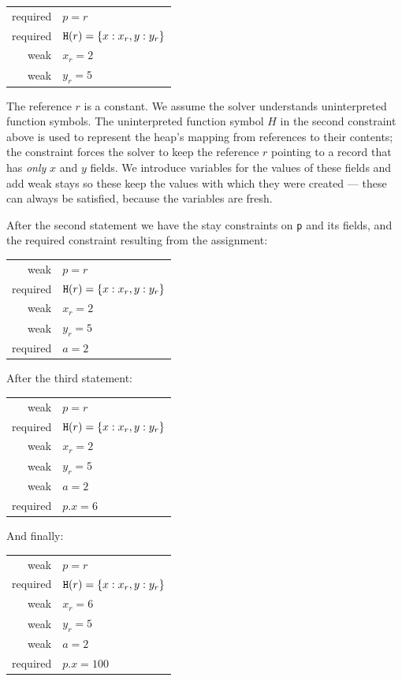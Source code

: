 \documentclass{article}
\newcommand{\Deref}{\texttt{\upshape H}}
\begin{document}
\begin{tabular}{rl}
required & $p = r$ \\
required & $\Deref(r) = \{x:x_r, y:y_r\}$\\
weak & $x_r = 2$\\
weak & $y_r = 5$\\
\end{tabular}

The reference $r$ is a constant. We assume the solver understands
uninterpreted function symbols.  The uninterpreted function symbol $H$
in the second constraint above is used to represent the heap's mapping
from references to their contents; the constraint forces the solver to
keep the reference $r$ pointing to a record that has \emph{only} $x$
and $y$ fields. We introduce variables for the values of these fields
and add weak stays so these keep the values with which they were
created --- these can always be satisfied, because the variables are
fresh.

After the second statement we have the stay constraints on \verb|p|
and its fields, and the required constraint resulting from the
assignment:

\begin{tabular}{rl}
weak & $p = r$ \\
required & $\Deref(r) = \{x:x_r, y:y_r\}$\\
weak & $x_r = 2$\\
weak & $y_r = 5$\\
required & $a = 2$
\end{tabular}

After the third statement:

\begin{tabular}{rl}
weak & $p = r$ \\
required & $\Deref(r) = \{x:x_r, y:y_r\}$\\
weak & $x_r = 2$\\
weak & $y_r = 5$\\
weak & $a = 2$ \\
required & $p.x = 6$
\end{tabular}


And finally:

\begin{tabular}{rl}
weak & $p = r$ \\
required & $\Deref(r) = \{x:x_r, y:y_r\}$\\
weak & $x_r = 6$\\
weak & $y_r = 5$\\
weak & $a = 2$ \\
required & $p.x = 100$
\end{tabular}
\end{document}
